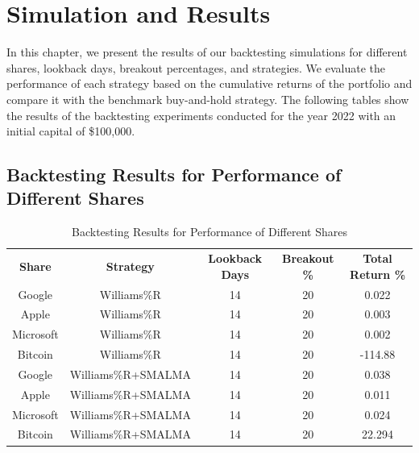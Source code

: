 
\chapter{Simulation and Results} %

\label{Chapter4} 
In this chapter, we present the results of our backtesting simulations for different shares, lookback days, breakout percentages, and strategies. We evaluate the performance of each strategy based on the cumulative returns of the portfolio and compare it with the benchmark buy-and-hold strategy. The following tables show the results of the backtesting experiments conducted for the year 2022 with an initial capital of \$100,000.

\section{Backtesting Results for Performance of Different Shares}

\begin{table}[h!]
\centering
\caption{Backtesting Results for Performance of Different Shares}
\label{table:backtesting1}
\begin{tabular}{|c|c|c|c|c|}
\hline
\textbf{Share} & \textbf{Strategy} & \textbf{Lookback Days} & \textbf{Breakout \%} & \textbf{Total Return \%} \\

Google & Williams\%R & 14 & 20 & 0.022 \\

Apple & Williams\%R & 14 & 20 & 0.003 \\

Microsoft & Williams\%R & 14 & 20 & 0.002 \\

Bitcoin & Williams\%R & 14 & 20 & -114.88 \\

Google & Williams\%R+SMALMA & 14 & 20 & 0.038 \\

Apple & Williams\%R+SMALMA & 14 & 20 & 0.011 \\

Microsoft & Williams\%R+SMALMA & 14 & 20 & 0.024 \\

Bitcoin & Williams\%R+SMALMA & 14 & 20 & 22.294 \\
\hline
\end{tabular}
\end{table}

